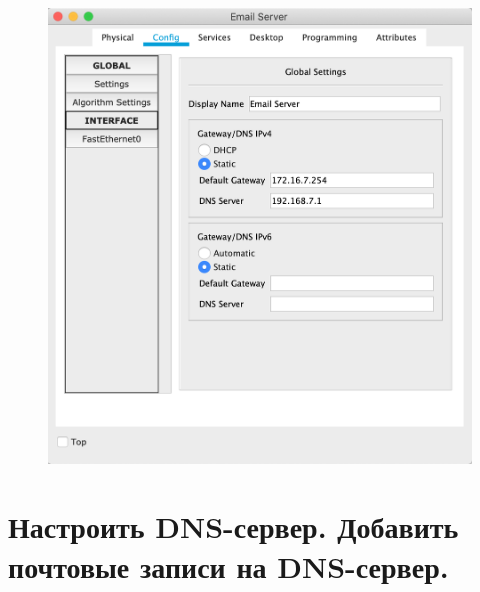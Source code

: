 \documentclass[a4paper,12pt]{article}
\begin{document}
\begin{figure}[h!]
\begin{minipage}[b]{0.32\textwidth}
		\end{minipage}
		\begin{minipage}[b]{0.32\textwidth}
			\includegraphics[width=\textwidth]{7.3.png}
		\end{minipage}
		\label{ris:7}
	\end{figure}

	\newpage

	\section{Настроить DNS-сервер. Добавить почтовые записи на DNS-сервер.}
	
\end{document}
